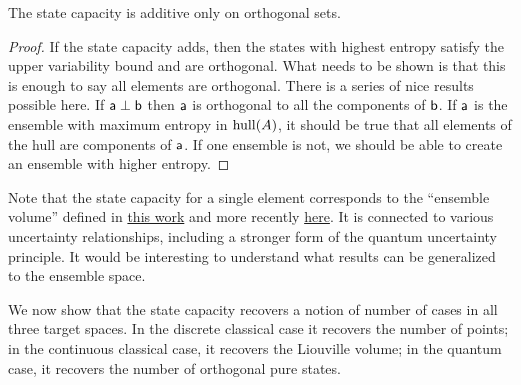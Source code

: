 \begin{mathSection}
\begin{conj}
	The state capacity is additive only on orthogonal sets.
\end{conj}

\begin{proof}
	If the state capacity adds, then the states with highest entropy satisfy the upper variability bound and are orthogonal. What needs to be shown is that this is enough to say all elements are orthogonal. There is a series of nice results possible here. If $\ens[a] \ortho \ens[b]$ then $\ens[a]$ is orthogonal to all the components of $\ens[b]$. If $\ens[a]$ is the ensemble with maximum entropy in $\hull(A)$, it should be true that all elements of the hull are components of $\ens[a]$. If one ensemble is not, we should be able to create an ensemble with higher entropy.
\end{proof}
\end{mathSection}

Note that the state capacity for a single element corresponds to the ``ensemble volume'' defined in \href{https://arxiv.org/pdf/physics/9903045}{this work} and more recently \href{https://arxiv.org/pdf/1804.01343}{here}. It is connected to various uncertainty relationships, including a stronger form of the quantum uncertainty principle. It would be interesting to understand what results can be generalized to the ensemble space.

We now show that the state capacity recovers a notion of number of cases in all three target spaces. In the discrete classical case it recovers the number of points; in the continuous classical case, it recovers the Liouville volume; in the quantum case, it recovers the number of orthogonal pure states.


